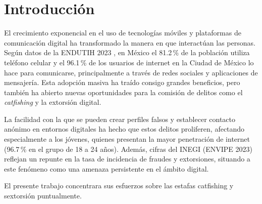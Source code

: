 \chapter{Introducción}





El crecimiento exponencial en el uso de tecnologías móviles y plataformas de comunicación digital ha transformado la manera en que interactúan las personas. Según datos de la ENDUTIH 2023 \cite{UsoInternetPorEstado}, en México el 81.2\,\% de la población utiliza teléfono celular y el 96.1\,\% de los usuarios de internet en la Ciudad de México lo hace para comunicarse, principalmente a través de redes sociales y aplicaciones de mensajería. Esta adopción masiva ha traído consigo grandes beneficios, pero también ha abierto nuevas oportunidades para la comisión de delitos como el \textit{catfishing} y la extorsión digital.

La facilidad con la que se pueden crear perfiles falsos y establecer contacto anónimo en entornos digitales ha hecho que estos delitos proliferen, afectando especialmente a los jóvenes, quienes presentan la mayor penetración de internet (96.7\,\% en el grupo de 18 a 24 años). Además, cifras del INEGI (ENVIPE 2023) \cite{ENVIPE2023} reflejan un repunte en la tasa de incidencia de fraudes y extorsiones, situando a este fenómeno como una amenaza persistente en el ámbito digital.

El presente trabajo concentrara sus esfuerzos sobre las estafas catfishing y sextorsión puntualmente.




